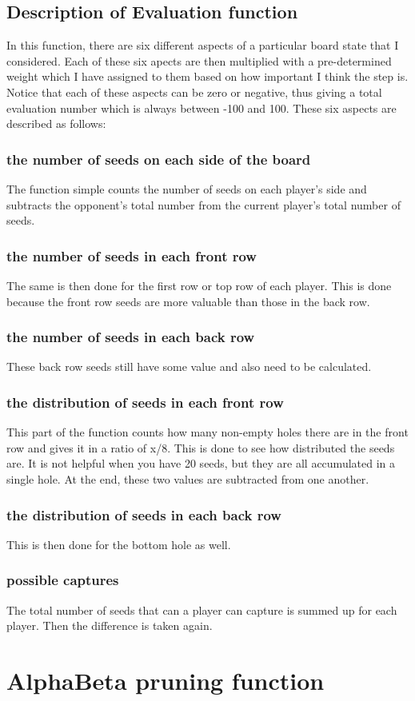 \documentclass[a4paper]{article}
\begin{document}
	\subsection{Description of Evaluation function}
	In this function, there are six different aspects of a particular board state that I considered. Each of these six 
	apects are then multiplied with a pre-determined weight which I have assigned to them based on how important I think the 			step is.  Notice that each of these aspects can be zero or negative, thus giving a total evaluation number which is always 
	between -100 and 100. These six aspects are described as follows:
	\subsubsection{the number of seeds on each side of the board}
	The function simple counts the number of seeds on each player's side and subtracts the opponent's total number
	from the current player's total number of seeds.
	\subsubsection{the number of seeds in each front row}
	The same is then done for the first row or top row of each player. This is done because the front row seeds are more 
	valuable than those in the back row.
	\subsubsection{the number of seeds in each back row}
	These back row seeds still have some value and also need to be calculated.
	\subsubsection{the distribution of seeds in each front row}
	This part of the function counts how many non-empty holes there are in the front row and gives it in a ratio of x/8. This
	is done to see how distributed the seeds are. It is not helpful when you have 20 seeds, but they are all accumulated in
	a single hole. At the end, these two values are subtracted from one another.
	\subsubsection{the distribution of seeds in each back row}
	This is then done for the bottom hole as well.
	\subsubsection{possible captures}
	The total number of seeds that can a player can capture is summed up for each player. Then the difference is taken again. 
	

\section{AlphaBeta pruning function}
\begin{lstlisting}
\end{lstlisting}
\end{document}

